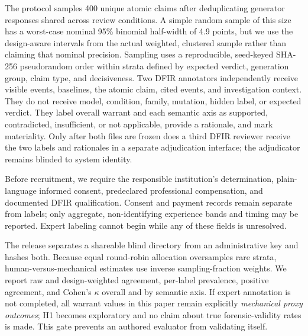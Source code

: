\documentclass[letterpaper,twocolumn,10pt]{article}
\begin{document}
The protocol samples 400 unique atomic claims after deduplicating generator
responses shared across review conditions.  A simple random sample of this size
has a worst-case nominal 95\% binomial half-width of 4.9 points, but we use the
design-aware intervals from the actual weighted, clustered sample rather than
claiming that nominal precision.  Sampling uses a reproducible, seed-keyed
SHA-256 pseudorandom order within strata defined by expected verdict,
generation group, claim type, and decisiveness.
Two DFIR annotators independently receive visible events, baselines, the atomic
claim, cited events, and investigation context.  They do not receive model,
condition, family, mutation, hidden label, or expected verdict.  They label
overall warrant and each semantic axis as supported, contradicted,
insufficient, or not applicable, provide a rationale, and mark materiality.
Only after both files are frozen does a third DFIR reviewer receive the two
labels and rationales in a separate adjudication interface; the adjudicator
remains blinded to system identity.

Before recruitment, we require the responsible institution's determination,
plain-language informed consent, predeclared professional compensation, and
documented DFIR qualification.  Consent and payment records remain separate
from labels; only aggregate, non-identifying experience bands and timing may be
reported.  Expert labeling cannot begin while any of these fields is unresolved.

The release separates a shareable blind directory from an administrative key
and hashes both.  Because equal round-robin allocation oversamples rare strata,
human-versus-mechanical estimates use inverse sampling-fraction weights.  We
report raw and design-weighted agreement, per-label prevalence, positive
agreement, and Cohen's $\kappa$ overall and by semantic axis.  If expert
annotation is not completed, all warrant values in this paper remain explicitly
\emph{mechanical proxy outcomes}; H1 becomes exploratory and no claim about
true forensic-validity rates is made.  This gate prevents an authored
evaluator from validating itself.
\end{document}
